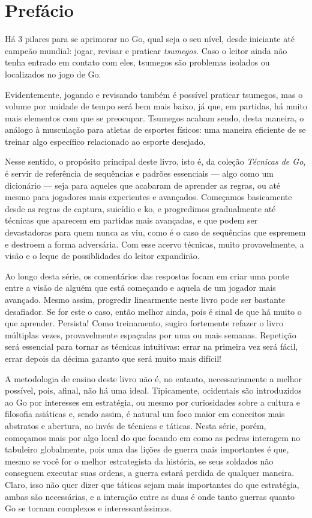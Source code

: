 \chapter{Prefácio}

Há 3 pilares para se aprimorar no Go, qual seja o seu nível, desde iniciante até campeão mundial: jogar, revisar e praticar \emph{\glspl{tsumego}}. Caso o leitor ainda não tenha entrado em contato com eles, tsumegos são problemas isolados ou localizados no jogo de Go.

Evidentemente, jogando e revisando também é possível praticar tsumegos, mas o volume por unidade de tempo será bem mais baixo, já que, em partidas, há muito mais elementos com que se preocupar. Tsumegos acabam sendo, desta maneira, o análogo à musculação para atletas de esportes físicos: uma maneira eficiente de se treinar algo específico relacionado ao esporte desejado.

Nesse sentido, o propósito principal deste livro, isto é, da coleção \emph{Técnicas de Go}, é servir de referência de sequências e padrões essenciais --- algo como um dicionário --- seja para aqueles que acabaram de aprender as regras, ou até mesmo para jogadores mais experientes e avançados. Começamos basicamente desde as regras de captura, suicídio e ko, e progredimos gradualmente até técnicas que aparecem em partidas mais avançadas, e que podem ser devastadoras para quem nunca as viu, como é o caso de sequências que espremem e destroem a forma adversária. Com esse acervo técnicas, muito provavelmente, a visão e o leque de possiblidades do leitor expandirão.

Ao longo desta série, os comentários das respostas focam em criar uma ponte entre a visão de alguém que está começando e aquela de um jogador mais avançado. Mesmo assim, progredir linearmente neste livro pode ser bastante desafiador. Se for este o caso, então melhor ainda, pois é sinal de que há muito o que aprender. Persista! Como treinamento, sugiro fortemente refazer o livro múltiplas vezes, provavelmente espaçadas por uma ou mais semanas. Repetição será essencial para tornar as técnicas intuitivas: errar na primeira vez será fácil, errar depois da décima garanto que será muito mais difícil!

A metodologia de ensino deste livro não é, no entanto, necessariamente a melhor possível, pois, afinal, não há uma ideal. Tipicamente, ocidentais são introduzidos ao Go por interesses em estratégia, ou mesmo por curiosidades sobre a cultura e filosofia asiáticas e, sendo assim, é natural um foco maior em conceitos mais abstratos e abertura, ao invés de técnicas e táticas. Nesta série, porém, começamos mais por algo local do que focando em como as pedras interagem no tabuleiro globalmente, pois uma das lições de guerra mais importantes é que, mesmo se você for o melhor estrategista da história, se seus soldados não conseguem executar suas ordens, a guerra estará perdida de qualquer maneira. Claro, isso não quer dizer que táticas sejam mais importantes do que estratégia, ambas são necessárias, e a interação entre as duas é onde tanto guerras quanto Go se tornam complexos e interessantíssimos.

